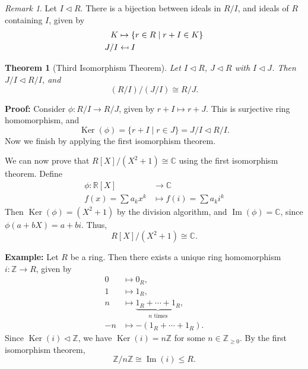 \documentclass[12pt]{article}
\DeclareMathOperator{\Ker}{Ker}
\DeclareMathOperator{\Img}{Im}
\newtheorem{theorem}{Theorem}[section]
\theoremstyle{definition}
\theoremstyle{remark}
\newtheorem*{remark}{Remark}
\newcommand{\mapsfrom}{\mathrel{\reflectbox{\ensuremath{\mapsto}}}}
\begin{document}
\begin{remark}
	Let $I \lhd R$. There is a bijection between ideals in $R/I$, and ideals of $R$ containing $I$, given by
	\begin{align*}
		K &\mapsto \{r \in R \mid r + I \in K\} \\
			J/I &\mapsfrom I
		\end{align*}
\end{remark}

\begin{theorem}[Third Isomorphism Theorem]
	Let $I \lhd R$, $J \lhd R$ with $I \lhd J$. Then $J/I \lhd R/I$, and
	\[
		(R/I)/(J/I) \cong R/J
	.\]
\end{theorem}

\begin{adjustbox}{minipage = \columnwidth - 25.5pt, margin=1em, frame=1pt, margin=0em}
\textbf{Proof:} Consider $\phi : R/I \to R/J$, given by $r + I \mapsto r + J$. This is surjective ring homomorphism, and
\[
	\Ker(\phi) = \{r + I \mid r \in J\} = J/I \lhd R/I
.\]
Now we finish by applying the first isomorphism theorem.
\end{adjustbox}

We can now prove that $R[X]/(X^2 + 1) \cong \mathbb{C}$ using the first isomorphism theorem. Define
\begin{align*}
	\phi : \mathbb{R}[X] &\to \mathbb{C} \\
	f(x) = \sum a_k x^k &\mapsto f(i) = \sum a_k i^{k}
\end{align*}
Then $\Ker(\phi) = (X^2 + 1)$ by the division algorithm, and $\Img(\phi) = \mathbb{C}$, since $\phi(a + bX) = a + bi$. Thus,
\[
	R[X] / (X^2 + 1) \cong \mathbb{C}
.\]

\begin{adjustbox}{minipage = \columnwidth - 25.5pt, margin=1em, frame=1pt, margin=0em}
\textbf{Example:} Let $R$ be a ring. Then there exists a unique ring homomorphism $i : \mathbb{Z} \to R$, given by
\begin{align*}
	0 &\mapsto 0_R, \\
	1 &\mapsto 1_R, \\
	n &\mapsto \underbrace{1_R + \cdots + 1_R}_{n \text{ times}}, \\
	-n &\mapsto -(1_R + \cdots + 1_R).
\end{align*}
Since $\Ker(i) \lhd \mathbb{Z}$, we have $\Ker(i) = n \mathbb{Z}$ for some $n \in \mathbb{Z}_{\geq 0}$. By the first isomorphism theorem,
\[
	\mathbb{Z} / n \mathbb{Z} \cong \Img(i) \leq R
.\]
\end{adjustbox}
\end{document}
